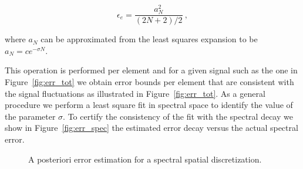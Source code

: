 \documentclass[10pt]{article}
\begin{document}
$$\epsilon_e=\frac{a_N^2}{(2N+2)/2}\ , $$

where $a_N$ can be approximated from the least squares expansion to be $a_N=ce^{-\sigma N}$.


This operation is performed per element and for a given signal such as the one in Figure~\ref{fig:err_tot} we obtain error bounds per element that are consistent with the signal fluctuations as illustrated in Figure~\ref{fig:err_tot}. As a general procedure we perform a least square fit in spectral space to identify the value of the parameter $\sigma$. To certify the consistency of the fit with the spectral decay we show in Figure~\ref{fig:err_spec} the estimated error decay versus the actual spectral error.




\begin{figure}[!ht]
\centering
{}
\quad
{}
\caption{A posteriori error estimation for a spectral spatial discretization.}
\end{figure}
\end{document}
